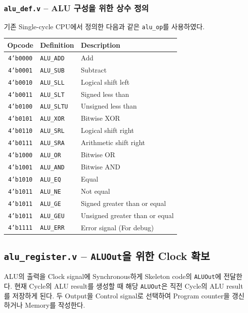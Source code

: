 \documentclass{scrartcl}
\begin{document}
\subsubsection{\texttt{alu\_def.v} -- ALU 구성을 위한 상수 정의}
기존 Single-cycle CPU에서 정의한 다음과 같은 \texttt{alu\_op}를 사용하였다.

\begin{center}
  \begin{tabular}{ | c | l | l | }
    \hline
    Opcode & Definition & Description \\ \hline
    \texttt{4'b0000} & \texttt{ALU\_ADD} & Add \\
    \texttt{4'b0001} & \texttt{ALU\_SUB} & Subtract \\
    \texttt{4'b0010} & \texttt{ALU\_SLL} & Logical shift left \\
    \texttt{4'b0011} & \texttt{ALU\_SLT} & Signed less than \\
    \texttt{4'b0100} & \texttt{ALU\_SLTU} & Unsigned less than \\
    \texttt{4'b0101} & \texttt{ALU\_XOR} & Bitwise XOR \\
    \texttt{4'b0110} & \texttt{ALU\_SRL} & Logical shift right \\
    \texttt{4'b0111} & \texttt{ALU\_SRA} & Arithmetic shift right \\
    \texttt{4'b1000} & \texttt{ALU\_OR} & Bitwise OR \\
    \texttt{4'b1001} & \texttt{ALU\_AND} & Bitwise AND \\
    \texttt{4'b1010} & \texttt{ALU\_EQ} & Equal \\
    \texttt{4'b1011} & \texttt{ALU\_NE} & Not equal \\
    \texttt{4'b1011} & \texttt{ALU\_GE} & Signed greater than or equal \\
    \texttt{4'b1011} & \texttt{ALU\_GEU} & Unsigned greater than or equal \\
    \texttt{4'b1111} & \texttt{ALU\_ERR} & Error signal (For debug) \\
    \hline
  \end{tabular}
\end{center}

\subsection{\texttt{alu\_register.v} -- \texttt{ALUOut}을 위한 Clock 확보}
ALU의 출력을 Clock signal에 Synchronous하게 Skeleton code의 \texttt{ALUOut}에 전달한다. 현재 Cycle의 ALU result를 생성할 때
해당 \texttt{ALUOut}은 직전 Cycle의 ALU result를 저장하게 된다. 두 Output을 Control signal로 선택하여
Program counter을 갱신하거나 Memory를 작성한다.
\end{document}
